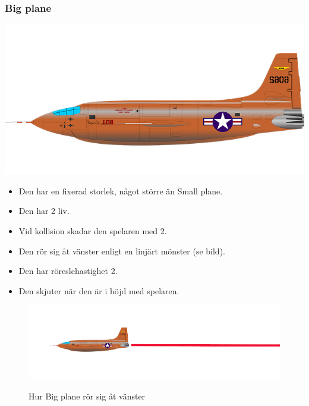 \documentclass{TDP005mall}
\begin{document}
\subsubsection*{Big plane}
\includegraphics[scale=0.2]{Images/Enemy2.png}
\begin{itemize}
\item Den har en fixerad storlek, något större än Small plane.
\item Den har 2 liv.
\item Vid kollision skadar den spelaren med 2.
\item Den rör sig åt vänster enligt en linjärt mönster (se bild).
\item Den har röreslehastighet 2.
\item Den skjuter när den är i höjd med spelaren.
\end{itemize}
\begin{figure}[h!]
  \centering
  \includegraphics[scale=0.4]{Images/Enemy2-movement.png}
  \label{Bild 2}
  \caption{Hur Big plane rör sig åt vänster}
\end{figure}

\newpage
\end{document}
